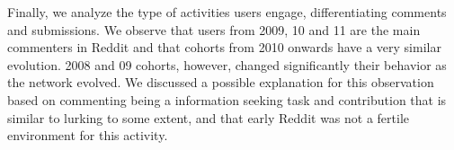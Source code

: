 Finally, we analyze the type of activities users engage, differentiating comments and submissions. We observe that users from 2009, 10 and 11 are the main commenters in Reddit and that cohorts from 2010 onwards have a very similar evolution. 2008 and 09 cohorts, however, changed significantly their behavior as the network evolved. We discussed a possible explanation for this observation based on commenting being a information seeking task and contribution  that is similar to lurking to some extent, and that early Reddit was not a fertile environment for this activity.
